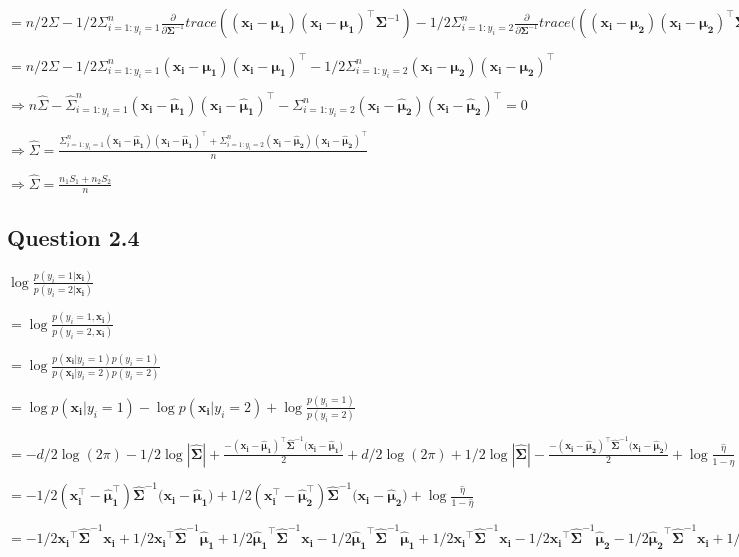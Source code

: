 \documentclass[
]{article}
\begin{document}
\(=n/2\Sigma -1/2 \Sigma_{i=1:y_i=1}^n \frac{\partial}{\partial\mathbf{\Sigma}^{-1}}trace((\mathbf{x_i-\mu_1})(\mathbf{x_i-\mu_1})^\top\mathbf{\Sigma}^{-1}) -1/2 \Sigma_{i=1:y_i=2}^n \frac{\partial}{\partial\mathbf{\Sigma}^{-1}}trace(((\mathbf{x_i-\mu_2})(\mathbf{x_i-\mu_2})^\top\mathbf{\Sigma}^{-1} )\)

\(=n/2\Sigma -1/2 \Sigma_{i=1:y_i=1}^n (\mathbf{x_i-\mu_1})(\mathbf{x_i-\mu_1})^\top -1/2 \Sigma_{i=1:y_i=2}^n (\mathbf{x_i-\mu_2})(\mathbf{x_i-\mu_2})^\top\)

\(\Rightarrow n\hat\Sigma - \hat\Sigma_{i=1:y_i=1}^n (\mathbf{x_i-\hat\mu_1})(\mathbf{x_i-\hat\mu_1})^\top - \Sigma_{i=1:y_i=2}^n (\mathbf{x_i-\hat\mu_2})(\mathbf{x_i-\hat\mu_2})^\top = 0\)

\(\Rightarrow \hat\Sigma = \frac{\Sigma_{i=1:y_i=1}^n (\mathbf{x_i-\hat\mu_1})(\mathbf{x_i-\hat\mu_1})^\top + \Sigma_{i=1:y_i=2}^n (\mathbf{x_i-\hat\mu_2})(\mathbf{x_i-\hat\mu_2})^\top}{n}\)

\(\Rightarrow \hat\Sigma = \frac{n_1S_1 + n_2S_2}{n}\)

\hypertarget{question-2.4}{%
\subsection{Question 2.4}\label{question-2.4}}

\(\log\frac{p(y_i=1|\mathbf{x_i})}{p(y_i=2|\mathbf{x_i})}\)

\(=\log\frac{p(y_i=1,\mathbf{x_i})}{p(y_i=2, \mathbf{x_i})}\)

\(=\log\frac{p(\mathbf{x_i}|y_i=1)p(y_i=1)}{p(\mathbf{x_i}|y_i=2)p(y_i=2)}\)

\(=\log p(\mathbf{x_i}|y_i=1) - \log p(\mathbf{x_i}|y_i=2) + \log \frac{p(y_i=1)}{p(y_i=2)}\)

\(=-d/2\log(2\pi) - 1/2\log|\mathbf{\hat\Sigma}| + \frac{-(\mathbf{x_i-\hat\mu_1})^\top \mathbf{\hat\Sigma}^{-1} (\mathbf{x_i-\hat\mu_1)}}{2} + d/2\log(2\pi) + 1/2\log|\mathbf{\hat\Sigma}| - \frac{-(\mathbf{x_i-\hat\mu_2})^\top \mathbf{\hat\Sigma}^{-1} (\mathbf{x_i-\hat\mu_2)}}{2} + \log \frac{\hat\eta}{1-\hat\eta}\)

\(=-1/2(\mathbf{x_i^\top-\hat\mu_1^\top}) \mathbf{\hat\Sigma}^{-1} (\mathbf{x_i-\hat\mu_1)} + 1/2(\mathbf{x_i^\top-\hat\mu_2^\top}) \mathbf{\hat\Sigma}^{-1} (\mathbf{x_i-\hat\mu_2)} + \log \frac{\hat\eta}{1-\hat\eta}\)

\(=-1/2\mathbf{x_i}^\top\mathbf{\hat\Sigma}^{-1}\mathbf{x_i} +1/2\mathbf{x_i}^\top\mathbf{\hat\Sigma}^{-1}\mathbf{\hat\mu_1} +1/2 \mathbf{\hat\mu_1}^\top\mathbf{\hat\Sigma}^{-1}\mathbf{x_i} -1/2 \mathbf{\hat\mu_1}^\top\mathbf{\hat\Sigma}^{-1}\mathbf{\hat\mu_1} + 1/2\mathbf{x_i}^\top\mathbf{\hat\Sigma}^{-1}\mathbf{x_i} -1/2\mathbf{x_i}^\top\mathbf{\hat\Sigma}^{-1}\mathbf{\hat\mu_2} -1/2\mathbf{\hat\mu_2}^\top\mathbf{\hat\Sigma}^{-1}\mathbf{x_i} +1/2\mathbf{\hat\mu_2}^\top\mathbf{\hat\Sigma}^{-1}\mathbf{\hat\mu_2} + \log \frac{\hat\eta}{1-\hat\eta}\)
\end{document}
